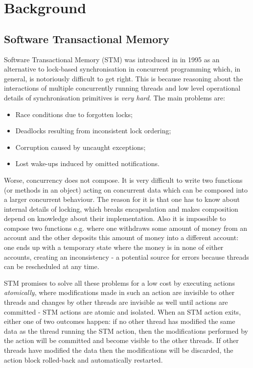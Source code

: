 \section{Background}
\label{sec:background}

\subsection{Software Transactional Memory}
Software Transactional Memory (STM) was introduced in \cite{shavit_software_1995} in 1995 as an alternative to lock-based synchronisation in concurrent programming which, in general, is notoriously difficult to get right. This is because reasoning about the interactions of multiple concurrently running threads and low level operational details of synchronisation primitives is \textit{very hard}. The main problems are:

\begin{itemize}
	\item Race conditions due to forgotten locks;
	\item Deadlocks resulting from inconsistent lock ordering;
	\item Corruption caused by uncaught exceptions;
	\item Lost wake-ups induced by omitted notifications.
\end{itemize}

Worse, concurrency does not compose. It is very difficult to write two functions (or methods in an object) acting on concurrent data which can be composed into a larger concurrent behaviour. The reason for it is that one has to know about internal details of locking, which breaks encapsulation and makes composition depend on knowledge about their implementation. Also it is impossible to compose two  functions e.g. where one withdraws some amount of money from an account and the other deposits this amount of money into a different account: one ends up with a temporary state where the money is in none of either accounts, creating an inconsistency - a potential source for errors because threads can be rescheduled at any time.

STM promises to solve all these problems for a low cost by executing actions \textit{atomically}, where modifications made in such an action are invisible to other threads and changes by other threads are invisible as well until actions are committed - STM actions are atomic and isolated. When an STM action exits, either one of two outcomes happen: if no other thread has modified the same data as the thread running the STM action, then the modifications performed by the action will be committed and become visible to the other threads. If other threads have modified the data then the modifications will be discarded, the action block rolled-back and automatically restarted.

